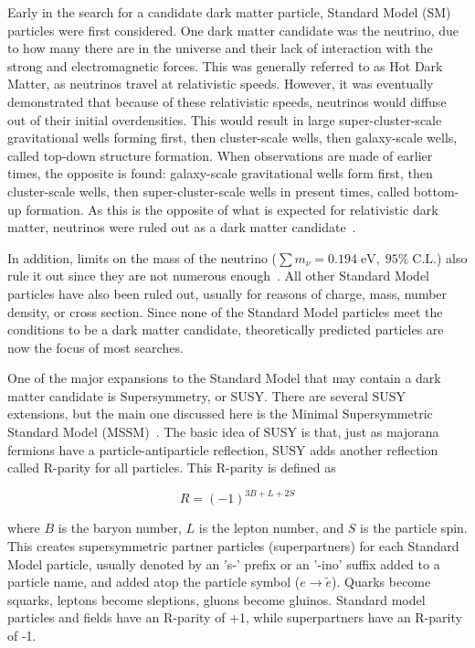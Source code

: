 Early in the search for a candidate dark matter particle, Standard Model (SM) particles were first considered.
One dark matter candidate was the neutrino, due to how many there are in the universe and their lack of interaction with the strong and electromagnetic forces.
This was generally referred to as Hot Dark Matter, as neutrinos travel at relativistic speeds.
However, it was eventually demonstrated that because of these relativistic speeds, neutrinos would diffuse out of their initial overdensities.
This would result in large super-cluster-scale gravitational wells forming first, then cluster-scale wells, then galaxy-scale wells, called top-down structure formation.
When observations are made of earlier times, the opposite is found: galaxy-scale gravitational wells form first, then cluster-scale wells, then super-cluster-scale wells in present times, called bottom-up formation.
As this is the opposite of what is expected for relativistic dark matter, neutrinos were ruled out as a dark matter candidate~\cite{neutrinoHeirarchical}.

In addition, limits on the mass of the neutrino ($\sum{}m_{\nu} = 0.194 \; \textrm{eV}, \; 95\% \; \textrm{C.L.}$) also rule it out since they are not numerous enough~\cite{planck2015}.
All other Standard Model particles have also been ruled out, usually for reasons of charge, mass, number density, or cross section.
Since none of the Standard Model particles meet the conditions to be a dark matter candidate, theoretically predicted particles are now the focus of most searches.

One of the major expansions to the Standard Model that may contain a dark matter candidate is Supersymmetry, or SUSY.
There are several SUSY extensions, but the main one discussed here is the Minimal Supersymmetric Standard Model (MSSM)~\cite{MSSM,supersym1,schelke_thesis}.
The basic idea of SUSY is that, just as majorana fermions have a particle-antiparticle reflection, SUSY adds another reflection called R-parity for all particles. 
This R-parity is defined as

\begin{equation}
  R = (-1)^{3B+L+2S}
\end{equation}

where $B$ is the baryon number, $L$ is the lepton number, and $S$ is the particle spin.
This creates supersymmetric partner particles (superpartners) for each Standard Model particle, usually denoted by an 's-' prefix or an '-ino' suffix added to a particle name, and \nicetilde{} added atop the particle symbol ($e \rightarrow \tilde{e}$).
Quarks become squarks, leptons become sleptions, gluons become gluinos.
Standard model particles and fields have an R-parity of +1, while superpartners have an R-parity of -1.

